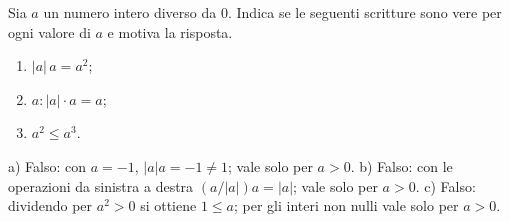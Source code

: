 
\begin{esercizio}
Sia $a$ un numero intero diverso da $0$. Indica se le seguenti scritture sono vere per ogni valore di $a$ e motiva la risposta.
    \begin{enumerate}
        \item $|a|\,a=a^2$;
        \item $a:|a|\cdot a=a$;
        \item $a^2\leq a^3$.
    \end{enumerate}
\end{esercizio}

\begin{soluzione}
a) Falso: con $a=-1$, $|a|a=-1\ne1$; vale solo per $a>0$.
b) Falso: con le operazioni da sinistra a destra $(a/|a|)a=|a|$; vale solo per $a>0$.
c) Falso: dividendo per $a^2>0$ si ottiene $1\le a$; per gli interi non nulli vale solo per $a>0$.
\end{soluzione}
